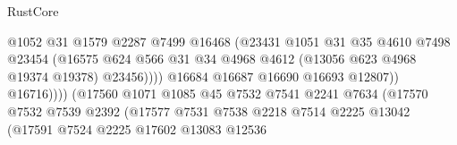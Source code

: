 \begin{lexlean}{RustCore}
\begin{coremodule}
                                                @1052
                                                @31
                                                @1579
                                                @2287
                                                @7499
                                                @16468
                                                (@23431
                                                  @1051
                                                  @31
                                                  @35
                                                  @4610
                                                  @7498
                                                  @23454
                                                  (@16575
                                                    @624
                                                    @566
                                                    @31
                                                    @34
                                                    @4968
                                                    @4612
                                                    (@13056 @623 @4968 @19374 @19378)
                                                    @23456))))
                                            @16684
                                            @16687
                                            @16690
                                            @16693
                                            @12807))
                                        @16716))))
                                (@17560
                                  @1071
                                  @1085
                                  @45
                                  @7532
                                  @7541
                                  @2241
                                  @7634
                                  (@17570
                                    @7532
                                    @7539
                                    @2392
                                    (@17577
                                      @7531
                                      @7538
                                      @2218
                                      @7514
                                      @2225
                                      @13042
                                      (@17591
                                        @7524
                                        @2225
                                        @17602
                                        @13083
                                        @12536

\end{coremodule}
\end{lexlean}
